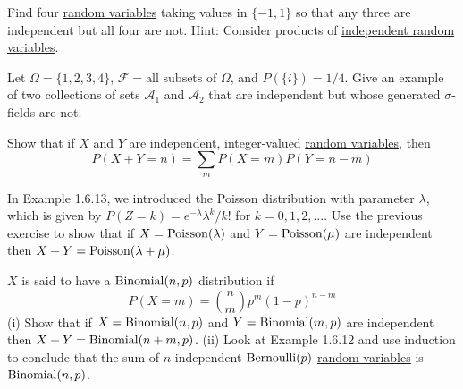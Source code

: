   \begin{exercise}[Durrett 2.1.8]
    Find four \hyperref[def:random-variable]{random variables} taking values in $\{-1, 1\}$ so that any three are independent but all four are not. Hint: Consider products of \hyperref[def:independent-random-variables]{independent random variables}.
  \end{exercise}
  \begin{solution}

  \end{solution}

  \begin{exercise}[Durrett 2.1.9]
    Let $\Omega = \{1, 2, 3, 4\}$, $\mathcal{F} = \text{all subsets of } \Omega$, and $P(\{i\}) = 1/4$. Give an example of two collections of sets $\mathcal{A}_1$ and $\mathcal{A}_2$ that are independent but whose generated $\sigma$-fields are not.
  \end{exercise}
  \begin{solution}

  \end{solution}

  \begin{exercise}[Durrett 2.1.10]
    Show that if $X$ and $Y$ are independent, integer-valued \hyperref[def:random-variable]{random variables}, then
    \begin{equation*}
      P(X + Y = n) = \sum_m P(X = m)P(Y = n - m)
    \end{equation*}
  \end{exercise}
  \begin{solution}

  \end{solution}

  \begin{exercise}[Durrett 2.1.11]
    In Example 1.6.13, we introduced the Poisson distribution with parameter $\lambda$, which is given by $P(Z = k) = e^{-\lambda}\lambda^k/k!$ for $k = 0, 1, 2, \dots$. Use the previous exercise to show that if $X = \operatorname{Poisson}(\lambda)$ and $Y = \operatorname{Poisson}(\mu)$ are independent then $X + Y = \operatorname{Poisson}(\lambda + \mu)$.
  \end{exercise}
  \begin{solution}

  \end{solution}

  \begin{exercise}[Durrett 2.1.12]
    $X$ is said to have a $\operatorname{Binomial}(n, p)$ distribution if
    \begin{equation*}
      P(X = m) = \binom{n}{m} p^m (1 - p)^{n-m}
    \end{equation*}
    (i) Show that if $X = \operatorname{Binomial}(n, p)$ and $Y = \operatorname{Binomial}(m, p)$ are independent then $X + Y = \operatorname{Binomial}(n + m, p)$. (ii) Look at Example 1.6.12 and use induction to conclude that the sum of $n$ independent $\operatorname{Bernoulli}(p)$ \hyperref[def:random-variable]{random variables} is $\operatorname{Binomial}(n, p)$.
  \end{exercise}
  \begin{solution}

  \end{solution}


